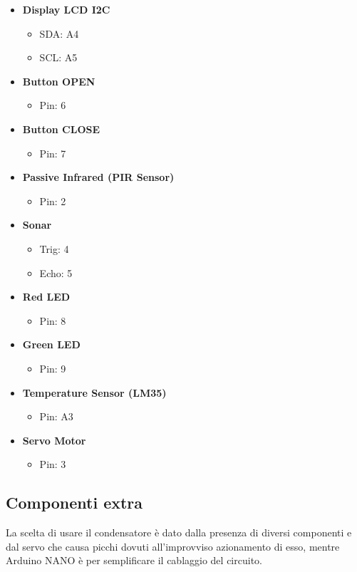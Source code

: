 \documentclass[a4paper,12pt]{report}
\begin{document}
\begin{itemize}
    \item \textbf{Display LCD I2C}
    \begin{itemize}
        \item SDA: A4
        \item SCL: A5
    \end{itemize}
    \item \textbf{Button OPEN}
    \begin{itemize}
        \item Pin: 6
    \end{itemize}
    \item \textbf{Button CLOSE}
    \begin{itemize}
        \item Pin: 7
    \end{itemize}
    \item \textbf{Passive Infrared (PIR Sensor)}
    \begin{itemize}
        \item Pin: 2
    \end{itemize}
    \item \textbf{Sonar}
    \begin{itemize}
        \item Trig: 4
        \item Echo: 5
    \end{itemize}
    \item \textbf{Red LED}
    \begin{itemize}
        \item Pin: 8
    \end{itemize}
    \item \textbf{Green LED}
    \begin{itemize}
        \item Pin: 9
    \end{itemize}
    \item \textbf{Temperature Sensor (LM35)}
    \begin{itemize}
        \item Pin: A3
    \end{itemize}
    \item \textbf{Servo Motor}
    \begin{itemize}
        \item Pin: 3
    \end{itemize}
\end{itemize}
\subsection{Componenti extra}
La scelta di usare il condensatore è dato dalla presenza di 
diversi componenti e dal servo che causa picchi dovuti all'improvviso
azionamento di esso, mentre Arduino NANO è per semplificare il cablaggio del circuito.
\end{document}
